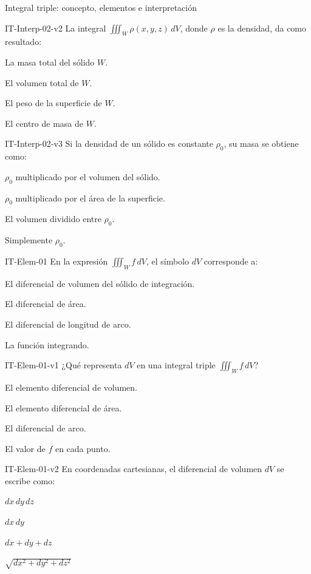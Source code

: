 \documentclass[a4,11pt]{aleph-notas}
\begin{document}
\begin{quiz}{Integral triple: concepto, elementos e interpretación}
\begin{multi}[]%
    {IT-Interp-02-v2}
    La integral $\displaystyle\iiint_W \rho(x,y,z)\,dV$, donde $\rho$ es la densidad, da como resultado:
    \item* La masa total del sólido $W$.
    \item El volumen total de $W$.
    \item El peso de la superficie de $W$.
    \item El centro de masa de $W$.
\end{multi}

\begin{multi}[]%
    {IT-Interp-02-v3}
    Si la densidad de un sólido es constante $\rho_0$, su masa se obtiene como:
    \item* $\rho_0$ multiplicado por el volumen del sólido.
    \item $\rho_0$ multiplicado por el área de la superficie.
    \item El volumen dividido entre $\rho_0$.
    \item Simplemente $\rho_0$.
\end{multi}

\begin{multi}[]%
    {IT-Elem-01}
    En la expresión $\displaystyle\iiint_W f\,dV$, el símbolo $dV$ corresponde a:
    \item* El diferencial de volumen del sólido de integración.
    \item El diferencial de área.
    \item El diferencial de longitud de arco.
    \item La función integrando.
\end{multi}

\begin{multi}[]%
    {IT-Elem-01-v1}
    ¿Qué representa $dV$ en una integral triple $\displaystyle\iiint_W f\,dV$?
    \item* El elemento diferencial de volumen.
    \item El elemento diferencial de área.
    \item El diferencial de arco.
    \item El valor de $f$ en cada punto.
\end{multi}

\begin{multi}[]%
    {IT-Elem-01-v2}
    En coordenadas cartesianas, el diferencial de volumen $dV$ se escribe como:
    \item* $dx\,dy\,dz$
    \item $dx\,dy$
    \item $dx+dy+dz$
    \item $\sqrt{dx^2+dy^2+dz^2}$
\end{multi}


\end{quiz}
\end{document}
